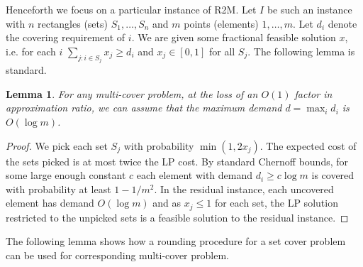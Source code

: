 \documentclass[11pt]{article}
\newtheorem{lemma}[thm]{Lemma}
\begin{document}
Henceforth we focus on a particular instance of R2M.
Let $I$ be such an instance with $n$ rectangles (sets) $S_1,\ldots,S_n$ and $m$ points (elements) $1,\ldots,m$. Let $d_i$ denote the covering requirement of $i$. 
We are given  some fractional feasible solution $x$, i.e. for each $i$  $\sum_{j: i \in S_j } x_j \geq d_i$ and $x_j \in [0,1]$ for all $S_j$.
The following lemma is standard.
\begin{lemma}
\label{lowdem}
For any multi-cover problem, 
at the loss of an $O(1)$ factor in approximation ratio, we can assume that the maximum demand $d=\max_i d_i$ is $O(\log m)$. 
\end{lemma}
\begin{proof}
We pick each set $S_j$ with probability $\min(1,2x_j)$. The expected cost of the sets picked is at most twice the LP cost.
By standard Chernoff bounds, for some large enough constant $c$
each element with demand $d_i \geq c \log m$ is covered 
with probability at least $1-1/m^2$. In the residual instance, each uncovered element has demand $O(\log m)$ 
and as $x_j \leq 1$ for each set, the LP solution restricted to the unpicked sets is a feasible solution to the residual instance.
\end{proof}

The following lemma shows how a rounding procedure for a set cover problem can be used for corresponding  multi-cover problem.
 
\end{document}

